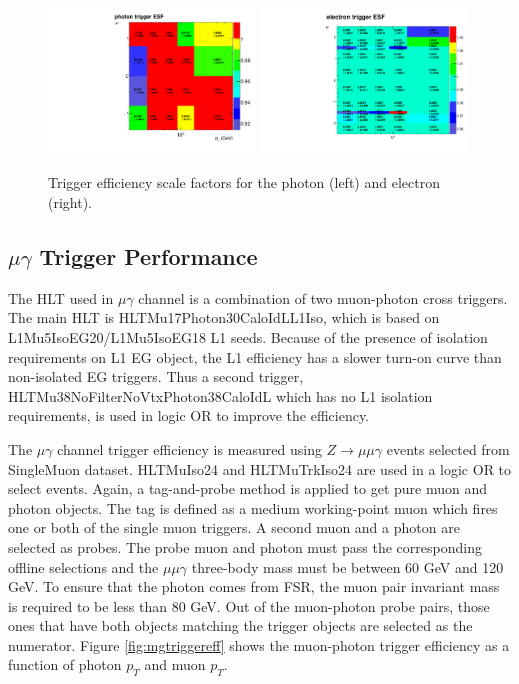 \documentclass[thesis.tex]{subfiles}
\renewcommand\_{\textunderscore\allowbreak}
\begin{document}
\begin{figure}[h]
  \centering
  \includegraphics[width=0.49\textwidth]{Figures/egTrigger_LeadingESF.pdf}
  \includegraphics[width=0.49\textwidth]{Figures/egTrigger_TrailingESF.pdf}
 \caption{Trigger efficiency scale factors for the photon (left) and electron (right). }
  \label{fig:egtriggerESF}
\end{figure}


\subsection{$\mu\gamma$ Trigger Performance}

The HLT used in $\mu\gamma$ channel is a combination of two muon-photon cross triggers.
The main HLT is HLT\_Mu17\_Photon30\_CaloIdL\_L1Iso, which is based on L1\_Mu5\_IsoEG20/L1\_Mu5\_IsoEG18 L1 seeds. 
Because of the presence of isolation requirements on L1 EG object, the L1 efficiency has a slower turn-on curve than non-isolated EG triggers.
Thus a second trigger, HLT\_Mu38NoFilterNoVtx\_Photon38\_CaloIdL which has no L1 isolation requirements, is used in logic OR to improve the efficiency.

The $\mu\gamma$ channel trigger efficiency is measured using $Z\rightarrow\mu\mu\gamma$ events selected from SingleMuon dataset. 
HLT\_MuIso24 and HLT\_MuTrkIso24 are used in a logic OR to select events. 
Again, a tag-and-probe method is applied to get pure muon and photon objects. 
The tag is defined as a medium working-point muon which fires one or both of the single muon triggers.
 A second muon and a photon are selected as probes. 
 The probe muon and photon must pass the corresponding offline selections and the $\mu\mu\gamma$ three-body mass must be between 60 GeV and 120 GeV. 
 To ensure that the photon comes from FSR, the muon pair invariant mass is required to be less than 80 GeV. 
 Out of the muon-photon probe pairs, those ones that have both objects matching the trigger objects are selected as the numerator. 
 Figure \ref{fig:mgtriggereff} shows the muon-photon trigger efficiency as a function of photon $p_{T}$ and muon $p_{T}$. 
\end{document}
